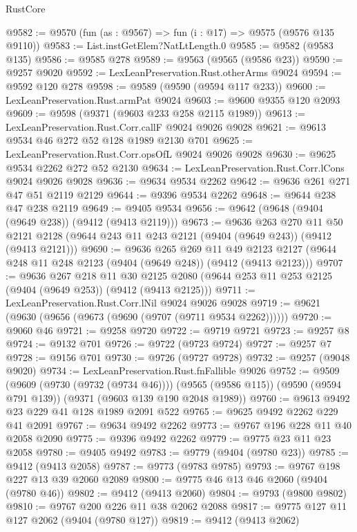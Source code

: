 \begin{lexlean}{RustCore}
\begin{coremodule}
@9582 := @9570 (fun (as : @9567) => fun (i : @17) => @9575 (@9576 @135 @9110))
@9583 := List.instGetElem?NatLtLength.{0}
@9585 := @9582 (@9583 @135)
@9586 := @9585 @278
@9589 := @9563 (@9565 (@9586 @23))
@9590 := @9257 @9020
@9592 := LexLeanPreservation.Rust.otherArms @9024
@9594 := @9592 @120 @278
@9598 := @9589 (@9590 (@9594 @117 @233))
@9600 := LexLeanPreservation.Rust.armPat @9024
@9603 := @9600 @9355 @120 @2093
@9609 := @9598 (@9371 (@9603 @233 @258 @2115 @1989))
@9613 := LexLeanPreservation.Rust.Corr.callF @9024 @9026 @9028
@9621 := @9613 @9534 @46 @272 @52 @128 @1989 @2130 @701
@9625 := LexLeanPreservation.Rust.Corr.opsOfL @9024 @9026 @9028
@9630 := @9625 @9534 @2262 @272 @52 @2130
@9634 := LexLeanPreservation.Rust.Corr.lCons @9024 @9026 @9028
@9636 := @9634 @9534 @2262
@9642 := @9636 @261 @271 @47 @51 @2119 @2129
@9644 := @9396 @9534 @2262
@9648 := @9644 @238 @47 @238 @2119
@9649 := @9405 @9534
@9656 := @9642 (@9648 (@9404 (@9649 @238)) (@9412 (@9413 @2119)))
@9673 := @9636
    @263
    @270
    @11
    @50
    @2121
    @2128
    (@9644 @243 @11 @243 @2121 (@9404 (@9649 @243)) (@9412 (@9413 @2121)))
@9690 := @9636
    @265
    @269
    @11
    @49
    @2123
    @2127
    (@9644 @248 @11 @248 @2123 (@9404 (@9649 @248)) (@9412 (@9413 @2123)))
@9707 := @9636
    @267
    @218
    @11
    @30
    @2125
    @2080
    (@9644 @253 @11 @253 @2125 (@9404 (@9649 @253)) (@9412 (@9413 @2125)))
@9711 := LexLeanPreservation.Rust.Corr.lNil @9024 @9026 @9028
@9719 := @9621 (@9630 (@9656 (@9673 (@9690 (@9707 (@9711 @9534 @2262))))))
@9720 := @9060 @46
@9721 := @9258 @9720
@9722 := @9719 @9721
@9723 := @9257 @8
@9724 := @9132 @701
@9726 := @9722 (@9723 @9724)
@9727 := @9257 @7
@9728 := @9156 @701
@9730 := @9726 (@9727 @9728)
@9732 := @9257 (@9048 @9020)
@9734 := LexLeanPreservation.Rust.fnFallible @9026
@9752 := @9509
    (@9609 (@9730 (@9732 (@9734 @46))))
    (@9565 (@9586 @115))
    (@9590 (@9594 @791 @139))
    (@9371 (@9603 @139 @190 @2048 @1989))
@9760 := @9613 @9492 @23 @229 @41 @128 @1989 @2091 @522
@9765 := @9625 @9492 @2262 @229 @41 @2091
@9767 := @9634 @9492 @2262
@9773 := @9767 @196 @228 @11 @40 @2058 @2090
@9775 := @9396 @9492 @2262
@9779 := @9775 @23 @11 @23 @2058
@9780 := @9405 @9492
@9783 := @9779 (@9404 (@9780 @23))
@9785 := @9412 (@9413 @2058)
@9787 := @9773 (@9783 @9785)
@9793 := @9767 @198 @227 @13 @39 @2060 @2089
@9800 := @9775 @46 @13 @46 @2060 (@9404 (@9780 @46))
@9802 := @9412 (@9413 @2060)
@9804 := @9793 (@9800 @9802)
@9810 := @9767 @200 @226 @11 @38 @2062 @2088
@9817 := @9775 @127 @11 @127 @2062 (@9404 (@9780 @127))
@9819 := @9412 (@9413 @2062)

\end{coremodule}
\end{lexlean}
